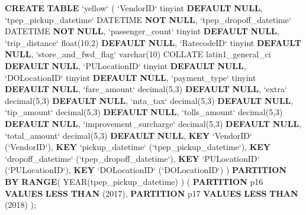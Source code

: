 \documentclass[12pt,twoside]{reedthesis}
\newenvironment{Shaded}{\begin{snugshade}}{\end{snugshade}}
\newcommand{\KeywordTok}[1]{\textcolor[rgb]{0.13,0.29,0.53}{\textbf{#1}}}
\newcommand{\DataTypeTok}[1]{\textcolor[rgb]{0.13,0.29,0.53}{#1}}
\newcommand{\DecValTok}[1]{\textcolor[rgb]{0.00,0.00,0.81}{#1}}
\newcommand{\NormalTok}[1]{#1}
\theoremstyle{definition}
\theoremstyle{definition}
\theoremstyle{definition}
\theoremstyle{remark}
\begin{document}
\begin{Shaded}
\begin{Highlighting}[]
\KeywordTok{CREATE} \KeywordTok{TABLE}\NormalTok{ `yellow` (}
\NormalTok{ `VendorID` tinyint }\KeywordTok{DEFAULT} \KeywordTok{NULL}\NormalTok{,}
\NormalTok{ `tpep_pickup_datetime` DATETIME }\KeywordTok{NOT} \KeywordTok{NULL}\NormalTok{,}
\NormalTok{ `tpep_dropoff_datetime` DATETIME }\KeywordTok{NOT} \KeywordTok{NULL}\NormalTok{,}
\NormalTok{ `passenger_count` tinyint }\KeywordTok{DEFAULT} \KeywordTok{NULL}\NormalTok{,}
\NormalTok{ `trip_distance` }\DataTypeTok{float}\NormalTok{(}\DecValTok{10}\NormalTok{,}\DecValTok{2}\NormalTok{) }\KeywordTok{DEFAULT} \KeywordTok{NULL}\NormalTok{,}
\NormalTok{ `RatecodeID` tinyint }\KeywordTok{DEFAULT} \KeywordTok{NULL}\NormalTok{,}
\NormalTok{ `store_and_fwd_flag` }\DataTypeTok{varchar}\NormalTok{(}\DecValTok{10}\NormalTok{) COLLATE latin1_general_ci }\KeywordTok{DEFAULT} \KeywordTok{NULL}\NormalTok{,}
\NormalTok{ `PULocationID` tinyint }\KeywordTok{DEFAULT} \KeywordTok{NULL}\NormalTok{,}
\NormalTok{ `DOLocationID` tinyint }\KeywordTok{DEFAULT} \KeywordTok{NULL}\NormalTok{,}
\NormalTok{ `payment_type` tinyint }\KeywordTok{DEFAULT} \KeywordTok{NULL}\NormalTok{,}
\NormalTok{ `fare_amount` }\DataTypeTok{decimal}\NormalTok{(}\DecValTok{5}\NormalTok{,}\DecValTok{3}\NormalTok{) }\KeywordTok{DEFAULT} \KeywordTok{NULL}\NormalTok{,}
\NormalTok{ `extra` }\DataTypeTok{decimal}\NormalTok{(}\DecValTok{5}\NormalTok{,}\DecValTok{3}\NormalTok{) }\KeywordTok{DEFAULT} \KeywordTok{NULL}\NormalTok{,}
\NormalTok{ `mta_tax` }\DataTypeTok{decimal}\NormalTok{(}\DecValTok{5}\NormalTok{,}\DecValTok{3}\NormalTok{) }\KeywordTok{DEFAULT} \KeywordTok{NULL}\NormalTok{,}
\NormalTok{ `tip_amount` }\DataTypeTok{decimal}\NormalTok{(}\DecValTok{5}\NormalTok{,}\DecValTok{3}\NormalTok{) }\KeywordTok{DEFAULT} \KeywordTok{NULL}\NormalTok{,}
\NormalTok{ `tolls_amount` }\DataTypeTok{decimal}\NormalTok{(}\DecValTok{5}\NormalTok{,}\DecValTok{3}\NormalTok{) }\KeywordTok{DEFAULT} \KeywordTok{NULL}\NormalTok{,}
\NormalTok{ `improvement_surcharge` }\DataTypeTok{decimal}\NormalTok{(}\DecValTok{5}\NormalTok{,}\DecValTok{3}\NormalTok{) }\KeywordTok{DEFAULT} \KeywordTok{NULL}\NormalTok{,}
\NormalTok{ `total_amount` }\DataTypeTok{decimal}\NormalTok{(}\DecValTok{5}\NormalTok{,}\DecValTok{3}\NormalTok{) }\KeywordTok{DEFAULT} \KeywordTok{NULL}\NormalTok{,}
 \KeywordTok{KEY}\NormalTok{ `VendorID` (`VendorID`),}
 \KeywordTok{KEY}\NormalTok{ `pickup_datetime` (`tpep_pickup_datetime`),}
 \KeywordTok{KEY}\NormalTok{ `dropoff_datetime` (`tpep_dropoff_datetime`),}
 \KeywordTok{KEY}\NormalTok{ `PULocationID` (`PULocationID`),}
 \KeywordTok{KEY}\NormalTok{ `DOLocationID` (`DOLocationID`)}
\NormalTok{)}
\KeywordTok{PARTITION} \KeywordTok{BY} \KeywordTok{RANGE}\NormalTok{( }\DataTypeTok{YEAR}\NormalTok{(tpep_pickup_datetime) ) (}
  \KeywordTok{PARTITION}\NormalTok{ p16 }\KeywordTok{VALUES} \KeywordTok{LESS} \KeywordTok{THAN}\NormalTok{ (}\DecValTok{2017}\NormalTok{),}
  \KeywordTok{PARTITION}\NormalTok{ p17 }\KeywordTok{VALUES} \KeywordTok{LESS} \KeywordTok{THAN}\NormalTok{ (}\DecValTok{2018}\NormalTok{)}
\NormalTok{);}



\end{Highlighting}
\end{Shaded}
\end{document}
